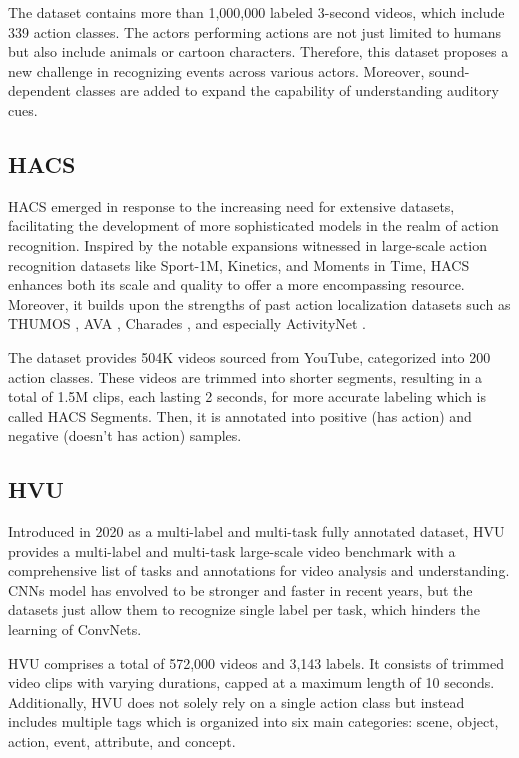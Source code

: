 \documentclass[a4paper]{article}
\begin{document}
The dataset contains more than 1,000,000 labeled 3-second videos, which include 339 action classes. The actors performing actions are not just limited to humans but also include animals or cartoon characters. Therefore, this dataset proposes a new challenge in recognizing events across various actors. Moreover, sound-dependent classes are added to expand the capability of understanding auditory cues.
\subsection{HACS}
HACS \cite{HACS} emerged in response to the increasing need for extensive datasets, facilitating the development of more sophisticated models in the realm of action recognition. Inspired by the notable expansions witnessed in large-scale action recognition datasets like Sport-1M, Kinetics, and Moments in Time, HACS enhances both its scale and quality to offer a more encompassing resource. Moreover, it builds upon the strengths of past action localization datasets such as THUMOS \cite{THUMOS}, AVA \cite{AVA}, Charades \cite{Charades}, and especially ActivityNet \cite{ActivityNet}. 

The dataset provides 504K videos sourced from YouTube, categorized into 200 action classes. These videos are trimmed into shorter segments, resulting in a total of 1.5M clips, each lasting 2 seconds, for more accurate labeling which is called HACS Segments. Then, it is annotated into positive (has action) and negative (doesn't has action) samples.
\subsection{HVU}
Introduced in 2020 as a multi-label and multi-task fully annotated dataset, HVU \cite{HVU} provides a multi-label and multi-task large-scale video benchmark with a comprehensive list of tasks and annotations for video analysis and understanding. CNNs model has envolved to be stronger and faster in recent years, but the datasets just allow them to recognize single label per task, which hinders the learning of ConvNets. 

HVU comprises a total of 572,000 videos and 3,143 labels. It consists of trimmed video clips with varying durations, capped at a maximum length of 10 seconds. Additionally, HVU does not solely rely on a single action class but instead includes multiple tags which is organized into six main categories: scene, object, action, event, attribute, and concept.
\end{document}
